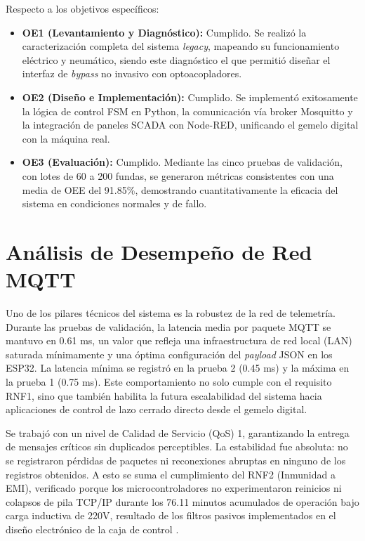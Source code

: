 Respecto a los objetivos específicos:
\begin{itemize}
    \item \textbf{OE1 (Levantamiento y Diagnóstico):} Cumplido. Se realizó la caracterización completa del sistema \textit{legacy}, mapeando su funcionamiento eléctrico y neumático, siendo este diagnóstico el que permitió diseñar el interfaz de \textit{bypass} no invasivo con optoacopladores.
    \item \textbf{OE2 (Diseño e Implementación):} Cumplido. Se implementó exitosamente la lógica de control FSM en Python, la comunicación vía broker Mosquitto y la integración de paneles SCADA con Node-RED, unificando el gemelo digital con la máquina real.
    \item \textbf{OE3 (Evaluación):} Cumplido. Mediante las cinco pruebas de validación, con lotes de 60 a 200 fundas, se generaron métricas consistentes con una media de OEE del 91.85\%, demostrando cuantitativamente la eficacia del sistema en condiciones normales y de fallo.
\end{itemize}

\section{Análisis de Desempeño de Red MQTT}

Uno de los pilares técnicos del sistema es la robustez de la red de telemetría. Durante las pruebas de validación, la latencia media por paquete MQTT se mantuvo en 0.61 ms, un valor que refleja una infraestructura de red local (LAN) saturada mínimamente y una óptima configuración del \textit{payload} JSON en los ESP32. La latencia mínima se registró en la prueba 2 (0.45 ms) y la máxima en la prueba 1 (0.75 ms). Este comportamiento no solo cumple con el requisito RNF1, sino que también habilita la futura escalabilidad del sistema hacia aplicaciones de control de lazo cerrado directo desde el gemelo digital.

Se trabajó con un nivel de Calidad de Servicio (QoS) 1, garantizando la entrega de mensajes críticos sin duplicados perceptibles. La estabilidad fue absoluta: no se registraron pérdidas de paquetes ni reconexiones abruptas en ninguno de los registros obtenidos. A esto se suma el cumplimiento del RNF2 (Inmunidad a EMI), verificado porque los microcontroladores no experimentaron reinicios ni colapsos de pila TCP/IP durante los 76.11 minutos acumulados de operación bajo carga inductiva de 220V, resultado de los filtros pasivos implementados en el diseño electrónico de la caja de control \cite{caiza2020}.

